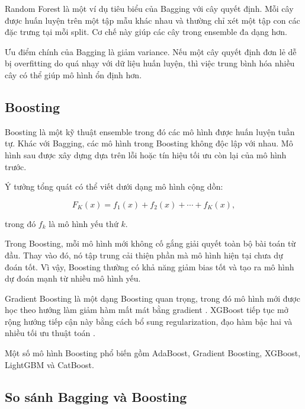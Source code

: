 Random Forest là một ví dụ tiêu biểu của Bagging với cây quyết định. Mỗi cây được huấn luyện trên một tập mẫu khác nhau và thường chỉ xét một tập con các đặc trưng tại mỗi split. Cơ chế này giúp các cây trong ensemble đa dạng hơn.

Ưu điểm chính của Bagging là giảm variance. Nếu một cây quyết định đơn lẻ dễ bị overfitting do quá nhạy với dữ liệu huấn luyện, thì việc trung bình hóa nhiều cây có thể giúp mô hình ổn định hơn.

\subsection{Boosting}

Boosting là một kỹ thuật ensemble trong đó các mô hình được huấn luyện tuần tự. Khác với Bagging, các mô hình trong Boosting không độc lập với nhau. Mô hình sau được xây dựng dựa trên lỗi hoặc tín hiệu tối ưu còn lại của mô hình trước.

Ý tưởng tổng quát có thể viết dưới dạng mô hình cộng dồn:

\[
F_K(x) = f_1(x) + f_2(x) + \cdots + f_K(x),
\]

trong đó $f_k$ là mô hình yếu thứ $k$.

Trong Boosting, mỗi mô hình mới không cố gắng giải quyết toàn bộ bài toán từ đầu. Thay vào đó, nó tập trung cải thiện phần mà mô hình hiện tại chưa dự đoán tốt. Vì vậy, Boosting thường có khả năng giảm bias tốt và tạo ra mô hình dự đoán mạnh từ nhiều mô hình yếu.

Gradient Boosting là một dạng Boosting quan trọng, trong đó mô hình mới được học theo hướng làm giảm hàm mất mát bằng gradient \cite{friedman2001gradient}. XGBoost tiếp tục mở rộng hướng tiếp cận này bằng cách bổ sung regularization, đạo hàm bậc hai và nhiều tối ưu thuật toán \cite{chen2016xgboost}.

Một số mô hình Boosting phổ biến gồm AdaBoost, Gradient Boosting, XGBoost, LightGBM và CatBoost.

\subsection{So sánh Bagging và Boosting}

